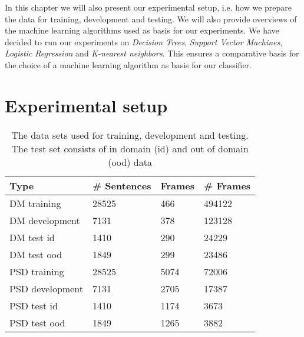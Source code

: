In this chapter we will also present our experimental setup, i.e. how we prepare the data for training, development and testing. We will also provide overviews of the machine learning algorithms used as basis for our experiments. We have decided to run our experiments on \textit{Decision Trees}, \textit{Support Vector Machines}, \textit{Logistic Regression} and \textit{K-nearest neighbors}. This ensures a comparative basis for the choice of a machine learning algorithm as basis for our classifier.


\section{Experimental setup}
\label{setup}

\begin{table}
    \centering
    \smaller[0.2]
    \begin{tabular}{@{}llll@{}}
        \toprule
        \textbf{Type} & \textbf{\# Sentences} & \textbf{Frames} & \textbf{\# Frames} \\
        \midrule
        DM training & 28525 & 466 & 494122 \\
        DM development & 7131 & 378 & 123128 \\
        DM test id & 1410 & 290 & 24229 \\
        DM test ood & 1849 & 299 & 23486 \\
        \midrule
        PSD training & 28525 & 5074 & 72006 \\
        PSD development & 7131 & 2705 & 17387 \\
        PSD test id & 1410 & 1174 & 3673 \\
        PSD test ood & 1849 & 1265 & 3882 \\
        \bottomrule
    \end{tabular}
    \caption{The data sets used for training, development and testing. The test set consists of in domain (id) and out of domain (ood) data}
    \label{table:split}
\end{table}


